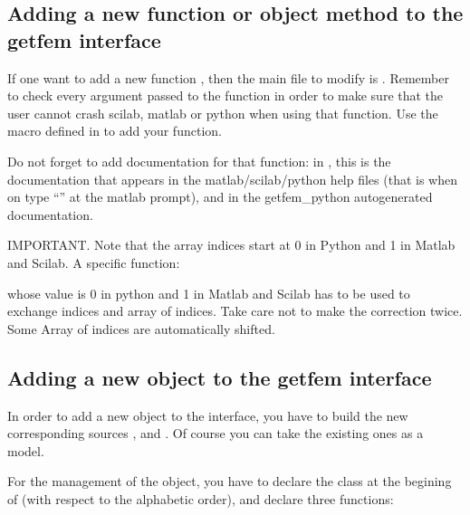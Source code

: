 \documentclass[a4paper,11pt,english]{sphinxmanual}
\begin{document}
\subsection{Adding a new function or object method to the getfem interface}
\label{\detokenize{project/libdesc_interface:adding-a-new-function-or-object-method-to-the-getfem-interface}}
If one want to add a new function , then the
main file to modify is . Remember to check every argument
passed to the function in order to make sure that the user cannot crash scilab, matlab or python when using that function. Use the macro defined in  to add your function.

Do not forget to add documentation for that function: in ,
this is the documentation that appears in the matlab/scilab/python help files (that is when on
type “” at the matlab prompt), and in the getfem\_python
autogenerated documentation.

IMPORTANT. Note that the array indices start at 0 in Python and 1 in Matlab and Scilab. A specific function:

\begin{sphinxVerbatim}[commandchars=\\\{\}]
\end{sphinxVerbatim}

whose value is 0 in python and 1 in Matlab and Scilab has to be used to exchange indices and array of indices. Take care not to make the correction twice. Some Array of indices are automatically shifted.


\subsection{Adding a new object to the getfem interface}
\label{\detokenize{project/libdesc_interface:adding-a-new-object-to-the-getfem-interface}}
In order to add a new object to the interface, you have to build the new corresponding sources ,  and . Of course you can take the existing ones as a model.

For the management of the object, you have to declare the class at the begining of  (with respect to the alphabetic order), and declare three functions:
\end{document}
